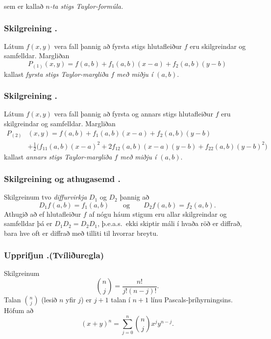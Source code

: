  
sem er kallað {\em $n$-ta stigs Taylor-formúla.}



 

\subsubsection{Skilgreining \kaflanr.}
 Látum $f(x,y)$ vera fall þannig að fyrsta stigs hlutafleiður $f$ eru skilgreindar og samfelldar.  Margliðan
$$P_{(1)}(x,y)=f(a,b)+f_1(a,b)(x-a)+f_2(a,b)(y-b)$$
kallast {\em fyrsta stigs Taylor-margliða $f$ með miðju í $(a,b)$}. 



\subsubsection{Skilgreining \kaflanr.}

Látum $f(x,y)$ vera fall þannig að fyrsta og annars
stigs hlutafleiður $f$ eru skilgreindar og samfelldar.  Margliðan
\begin{align*}P_{(2)}&(x,y)=f(a,b)+f_1(a,b)(x-a)+f_2(a,b)(y-b)\\
&+\frac{1}{2}\big(f_{11}(a,b)(x-a)^2+
2f_{12}(a,b)(x-a)(y-b)+f_{22}(a,b)(y-b)^2\big)
\end{align*}
kallast {\em annars stigs Taylor-margliða $f$ með miðju í $(a,b)$}.  



\subsubsection{Skilgreining og athugasemd \kaflanr.}
Skilgreinum tvo {\em diffurvirkja} $D_1$ og $D_2$ þannig að 
$$D_1f(a,b)=f_1(a,b)\qquad\mbox{og}\qquad
D_2f(a,b)=f_2(a,b).$$
Athugið að ef hlutafleiður $f$ af nógu háum stigum eru allar skilgreindar og samfelldar þá er $D_1D_2=D_2D_1$, þ.e.a.s.\ ekki skiptir máli í hvaða röð er diffrað, bara hve oft er diffrað með tilliti til hvorrar breytu.




\subsubsection{Upprifjun \kaflanr.(Tvíliðuregla)}
Skilgreinum 
$${n\choose j}=\frac{n!}{j!(n-j)!}.$$
Talan ${n\choose j}$ (lesið $n$ yfir $j$) er $j+1$ talan í $n+1$ línu Pascals-þríhyrningsins.
 Höfum að 
$$(x+y)^n=\sum_{j=0}^n \textstyle{n\choose j}x^jy^{n-j}.$$




